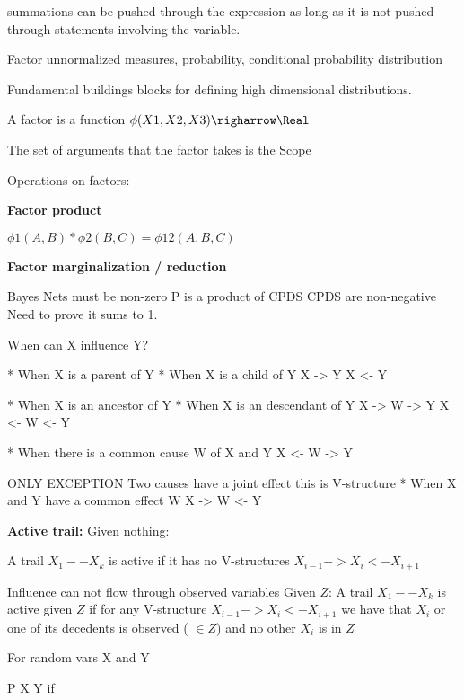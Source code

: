 \documentclass[10pt,twocolumn,letterpaper]{article}
\begin{document}
summations can be pushed through the expression as long as it is not pushed through statements involving the variable. 



Factor \ni unnormalized measures, probability, conditional probability distribution

Fundamental buildings blocks for defining high dimensional distributions. 

A factor is a function $\phi(X1, X2, X3) \righarrow \Real$

The set of arguments that the factor takes is the Scope


Operations on factors:

\textbf{Factor product}

$\phi1(A, B) * \phi2(B, C) = \phi12(A, B, C)$

\textbf{Factor marginalization / reduction}


Bayes Nets must be non-zero
P is a product of CPDS CPDS are non-negative
Need to prove it sums to 1.


When can X influence Y?

 * When X is a parent of Y
 * When X is a child of Y
 X -> Y
 X <- Y

 * When X is an ancestor of Y
 * When X is an descendant of Y
 X -> W -> Y
 X <- W <- Y

 * When there is a common cause W of X and Y
 X <- W -> Y

 ONLY EXCEPTION
 Two causes have a joint effect
 this is V-structure
 * When X and Y have a common effect W
 X -> W <- Y


\textbf{Active trail:}
Given nothing:

    A trail $X_1 -- X_k$ is active if it has no V-structures
    $X_{i-1} -> X_i <- X_{i+1}$

Influence can not flow through observed variables
Given $Z$:
     A trail $X_1 -- X_k$ is active given $Z$ if 
     for any V-structure 
     $X_{i-1} -> X_i <- X_{i+1}$
     we have that $X_i$ or one of its decedents is observed (\ie{} $\in Z$)
     and no other $X_i$ is in $Z$



 For random vars X and Y

 P \models X \perp Y if 
\end{document}
